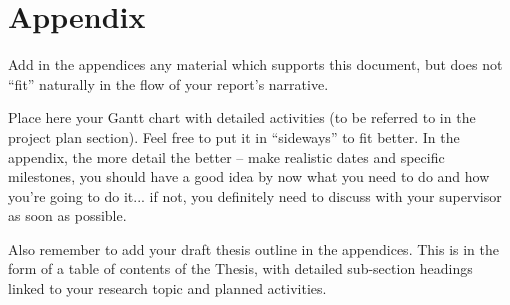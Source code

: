 \section*{Appendix}

Add in the appendices any material which supports this document, but does not “fit” naturally in the flow of your report’s narrative.

Place here your Gantt chart with detailed activities (to be referred to in the project plan section). Feel free to put it in “sideways” to fit better. In the appendix, the more detail the better – make realistic dates and specific milestones, you should have a good idea by now what you need to do and how you’re going to do it... if not, you definitely need to discuss with your supervisor as soon as possible.

Also remember to add your draft thesis outline in the appendices. This is in the form of a table of contents of the Thesis, with detailed sub-section headings linked to your research topic and planned activities.


